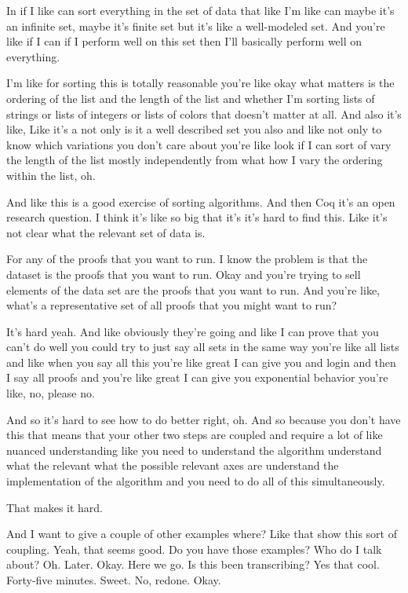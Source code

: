 \begin{subappendices}
    In if I like can sort everything in the set of data that like I'm like can maybe it's an infinite set, maybe it's finite set but it's like a well-modeled set. And you're like if I can if I perform well on this set then I'll basically perform well on everything. 
    
    I'm like for sorting this is totally reasonable you're like okay what matters is the ordering of the list and the length of the list and whether I'm sorting lists of strings or lists of integers or lists of colors that doesn't matter at all. And also it's like, Like it's a not only is it a well described set you also and like not only to know which variations you don't care about you're like look if I can sort of vary the length of the list mostly independently from what how I vary the ordering within the list, oh. 
    
    And like this is a good exercise of sorting algorithms. And then Coq it's an open research question. I think it's like so big that it's it's hard to find this. Like it's not clear what the relevant set of data is. 
    
    For any of the proofs that you want to run. I know the problem is that the dataset is the proofs that you want to run. Okay and you're trying to sell elements of the data set are the proofs that you want to run. And you're like, what's a representative set of all proofs that you might want to run? 
    
    It's hard yeah. And like obviously they're going and like I can prove that you can't do well you could try to just say all sets in the same way you're like all lists and like when you say all this you're like great I can give you and login and then I say all proofs and you're like great I can give you exponential behavior you're like, no, please no. 
    
    And so it's hard to see how to do better right, oh. And so because you don't have this that means that your other two steps are coupled and require a lot of like nuanced understanding like you need to understand the algorithm understand what the relevant what the possible relevant axes are understand the implementation of the algorithm and you need to do all of this simultaneously. 
    
    That makes it hard. 
    
    And I want to give a couple of other examples where? Like that show this sort of coupling. Yeah, that seems good. Do you have those examples? Who do I talk about? Oh. Later. Okay. Here we go. Is this been transcribing? Yes that cool. Forty-five minutes. Sweet. No, redone. Okay.
    

\end{subappendices}
